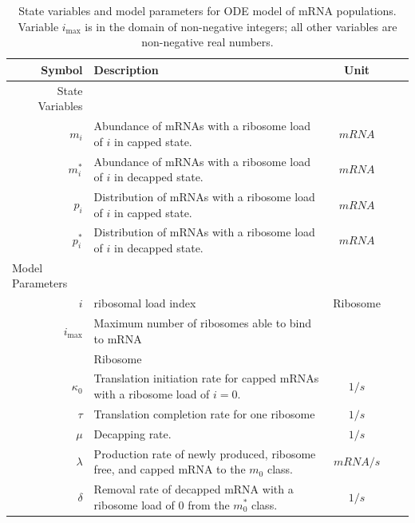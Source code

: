 \documentclass[review]{elsarticle}
\newcommand{\imax}{\ensuremath{{i_{\max}}}\xspace}
\begin{document}
\begin{table}
\centering
\begin{tabular}{|rp{4in}|c|c|c|}\hline
\textbf{Symbol}&\textbf{Description}&\textbf{Unit} \\\hline
State Variables & &  \\ \hline
$m_i$ & Abundance of mRNAs with a ribosome load of $i$ in capped state. & $mRNA$ \\
$m_i^*$ & Abundance of mRNAs with a ribosome load of $i$ in decapped state. & $mRNA$ \\ \hline
$p_i$ & Distribution of mRNAs with a ribosome load of $i$ in capped state. & $mRNA$ \\
$p_i^*$ & Distribution of mRNAs with a ribosome load of $i$ in decapped state. & $mRNA$ \\ \hline
\multicolumn{1}{l}{Model Parameters} \\ \hline
$i$ & ribosomal load index & Ribosome\\
 \imax & Maximum number of ribosomes able to bind to mRNA\\ & Ribosome \\
$\kappa_0$ & Translation initiation rate for capped mRNAs with a ribosome load of $i=0$. & $1/s$\\
$\tau$ & Translation completion rate for one ribosome & $1/s$\\
$\mu $ & Decapping rate. & $1/s$\\
$\lambda$ & Production rate of newly produced, ribosome free, and capped mRNA to the $m_0$ class. & $mRNA/s$\\
$\delta$ & Removal rate of decapped mRNA with a ribosome load of 0 from the $m_0^*$ class. & $1/s$\\ \hline 
\end{tabular}
\caption{State variables and model parameters for ODE model of mRNA populations.
Variable \imax is in the domain of non-negative integers; all other variables are non-negative real numbers.}
\label{tab:params}
\end{table}
\end{document}

